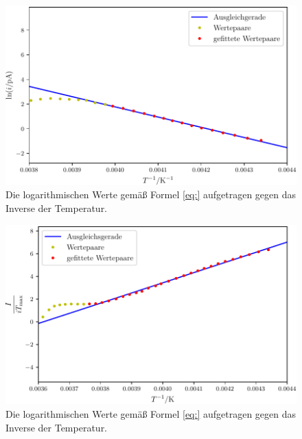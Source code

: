 \begin{figure}
	\centering
	\includegraphics[width=\linewidth-60pt,height=\textheight-60pt,keepaspectratio]{content/images/W2_1.pdf}
	\caption{Die logarithmischen Werte gemäß Formel \eqref{eq:} aufgetragen gegen das Inverse der Temperatur.}
	\label{fig:W2_1}
\end{figure}

\begin{figure}
	\centering
	\includegraphics[width=\linewidth-60pt,height=\textheight-60pt,keepaspectratio]{content/images/W2_2.pdf}
	\caption{Die logarithmischen Werte gemäß Formel \eqref{eq:} aufgetragen gegen das Inverse der Temperatur.}
	\label{fig:W2_2}
\end{figure}

%	

